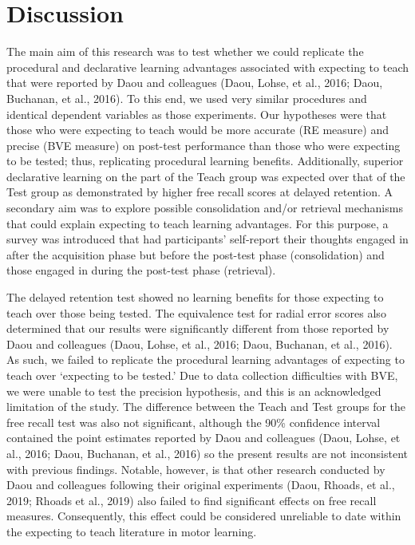 \documentclass[
  english,
  man,floatsintext]{apa7}
\begin{document}
\hypertarget{discussion}{%
\section{Discussion}\label{discussion}}

The main aim of this research was to test whether we could replicate the procedural and declarative learning advantages associated with expecting to teach that were reported by Daou and colleagues (Daou, Lohse, et al., 2016; Daou, Buchanan, et al., 2016). To this end, we used very similar procedures and identical dependent variables as those experiments. Our hypotheses were that those who were expecting to teach would be more accurate (RE measure) and precise (BVE measure) on post-test performance than those who were expecting to be tested; thus, replicating procedural learning benefits. Additionally, superior declarative learning on the part of the Teach group was expected over that of the Test group as demonstrated by higher free recall scores at delayed retention. A secondary aim was to explore possible consolidation and/or retrieval mechanisms that could explain expecting to teach learning advantages. For this purpose, a survey was introduced that had participants' self-report their thoughts engaged in after the acquisition phase but before the post-test phase (consolidation) and those engaged in during the post-test phase (retrieval).

The delayed retention test showed no learning benefits for those expecting to teach over those being tested. The equivalence test for radial error scores also determined that our results were significantly different from those reported by Daou and colleagues (Daou, Lohse, et al., 2016; Daou, Buchanan, et al., 2016). As such, we failed to replicate the procedural learning advantages of expecting to teach over `expecting to be tested.' Due to data collection difficulties with BVE, we were unable to test the precision hypothesis, and this is an acknowledged limitation of the study. The difference between the Teach and Test groups for the free recall test was also not significant, although the 90\% confidence interval contained the point estimates reported by Daou and colleagues (Daou, Lohse, et al., 2016; Daou, Buchanan, et al., 2016) so the present results are not inconsistent with previous findings. Notable, however, is that other research conducted by Daou and colleagues following their original experiments (Daou, Rhoads, et al., 2019; Rhoads et al., 2019) also failed to find significant effects on free recall measures. Consequently, this effect could be considered unreliable to date within the expecting to teach literature in motor learning.
\end{document}
